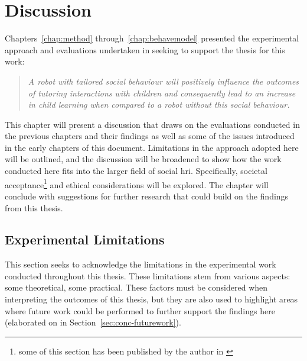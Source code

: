 \chapter{Discussion} \label{chap:maindisc}
Chapters~\ref{chap:method} through~\ref{chap:behavemodel} presented the experimental approach and evaluations undertaken in seeking to support the thesis for this work:

\begin{quote}
\textit{A robot with \gls{tailored} social behaviour will positively influence the outcomes of tutoring interactions with children and consequently lead to an increase in child \gls{learning} when compared to a robot without this social behaviour.}
\end{quote}

This chapter will present a discussion that draws on the evaluations conducted in the previous chapters and their findings as well as some of the issues introduced in the early chapters of this document. Limitations in the approach adopted here will be outlined, and the discussion will be broadened to show how the work conducted here fits into the larger field of social \acrshort{hri}. Specifically, societal acceptance\footnote{some of this section has been published by the author in \citep{kennedy2016cautious}} and ethical considerations will be explored. The chapter will conclude with suggestions for further research that could build on the findings from this thesis.

\section{Experimental Limitations} \label{sec:disc-limitations}
This section seeks to acknowledge the limitations in the experimental work conducted throughout this thesis. These limitations stem from various aspects: some theoretical, some practical. These factors must be considered when interpreting the outcomes of this thesis, but they are also used to highlight areas where future work could be performed to further support the findings here (elaborated on in Section~\ref{sec:conc-futurework}).

